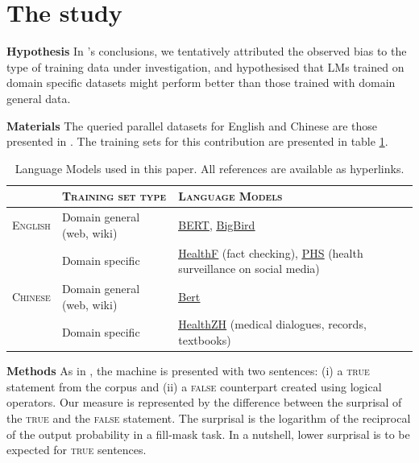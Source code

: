 \documentclass{IOS-Book-Article}
\begin{document}
\vspace{-4mm}
\section{The study}
\textbf{Hypothesis} In \cite{r1}'s conclusions, we tentatively attributed the observed bias to the type of training data under investigation, and hypothesised that LMs trained on domain specific datasets might perform better than those trained with domain general data.

\noindent \textbf{Materials} The queried parallel datasets for English and Chinese are those presented in \cite{r1}. The training sets for this contribution are presented in table \ref{models}.

\begin{table}[]
    \centering
    \begin{tabular}{l|l|l}
          & \textsc{Training set type} & \textsc{Language Models}\\ \hline
         \textsc{English} & Domain general (web, wiki) & \href{https://huggingface.co/bert-large-cased}{\underline{BERT}}, \href{https://huggingface.co/google/bigbird-pegasus-large-pubmed}{\underline{BigBird}}\\
         & Domain specific & \href{https://huggingface.co/austinmw/distilbert-base-uncased-finetuned-health_facts}{\underline{HealthF}} (fact checking), \href{https://huggingface.co/publichealthsurveillance/PHS-BERT}{\underline{PHS}} (health surveillance on social media)\\ \hline
         \textsc{Chinese} & Domain general (web, wiki) & \href{https://huggingface.co/bert-base-chinese}{\underline{Bert}}\\
         & Domain specific & \href{https://huggingface.co/nghuyong/ernie-health-zh}{\underline{HealthZH}} (medical dialogues, records, textbooks)\\ \hline
    \end{tabular}
    \caption{Language Models used in this paper. All references are available as hyperlinks.}
    \label{models}
\end{table}

\noindent \textbf{Methods} As in \cite{r1}, the machine is presented with two sentences: (i) a \textsc{true} statement from the corpus and (ii) a \textsc{false} counterpart created using logical operators. Our measure is represented by the difference between the surprisal of the \textsc{true} and the \textsc{false} statement. The surprisal is the logarithm of the reciprocal of the output probability in a fill-mask task. In a nutshell, lower surprisal is to be expected for \textsc{true} sentences.
\end{document}

